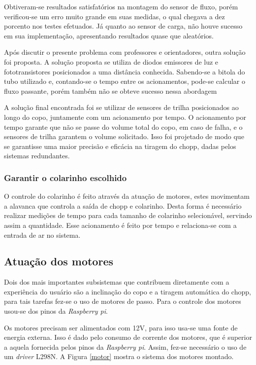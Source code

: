 Obtiveram-se resultados satisfatórios na montagem do sensor de fluxo, porém verificou-se um erro 
muito grande em suas medidas, o qual chegava a dez porcento nos testes efetuados. 
Já quanto ao sensor de carga, não houve sucesso em sua implementação, apresentando resultados quase que aleatórios.

Após discutir o presente problema com professores e orientadores, outra solução foi proposta.
A solução proposta se utiliza de diodos emissores de luz e fototransistores posicionados a 
uma distância conhecida. Sabendo-se a bitola do tubo utilizado e, contando-se o tempo entre 
os acionamentos, pode-se calcular o fluxo passante, porém também não se obteve sucesso nessa abordagem

A solução final encontrada foi se utilizar de sensores de trilha posicionados ao longo do copo, juntamente com um acionamento 
por tempo. O acionamento por tempo garante que não se passe do volume total do copo, em caso de falha,
e o sensores de trilha garantem o volume solicitado. Isso foi projetado de modo que se garantisse uma maior precisão e eficácia
na tiragem do chopp, dadas pelos sistemas redundantes.


\subsubsection{Garantir o colarinho escolhido}
O controle do colarinho é feito através da atuação de motores, estes  movimentam
a alavanca que controla a saída de chopp e colarinho. Desta forma é necessário realizar 
medições de tempo para cada tamanho de colarinho selecionável, servindo assim a quantidade. 
Esse acionamento é feito por tempo e relaciona-se com a entrada de ar no  sistema.


\subsection{Atuação dos motores}
Dois dos mais importantes subsistemas que contribuem diretamente com a experiência do usuário são 
a inclinação do copo e a tiragem automática do chopp, para tais tarefas fez-se o uso de motores de passo.
Para o controle dos motores usou-se dos pinos da \textit{Raspberry pi}.

Os motores precisam ser alimentados com 12V, para isso usa-se uma fonte de energia externa. Isso é dado pelo
 consumo de corrente dos motores, que é superior a aquela fornecida pelos pinos da \textit{Raspberry pi}. Assim,
fez-se necessário o uso de um \textit{driver} L298N. A Figura \ref{motor} mostra o sistema dos motores montado.

